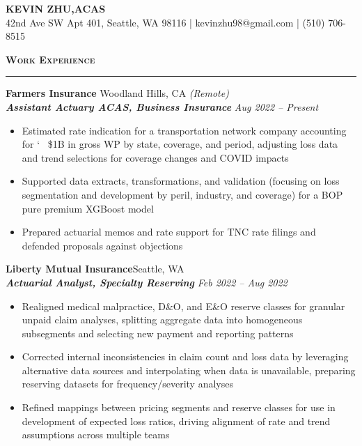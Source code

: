 \documentclass[11pt,letterpaper]{article}
\newcommand{\sectline}{\vspace{5pt}\hrule height 1.5pt\vspace{5pt}}
\newcommand{\sectspace}{\vspace{9pt}}
\newcommand{\smallspace}{\vspace{6pt}}
\newcommand{\heading}[1]{{\fontsize{12pt}{13pt} {\textbf{\textsc{#1}}}}}
\begin{document}
\centering
{\fontsize{13pt}{13pt}\selectfont \textbf{KEVIN ZHU,\hspace{1.7 mm}ACAS}} \vspace{2pt} \\

{\fontsize{11pt}{13pt} 42nd Ave SW Apt 401, Seattle, WA 98116 | kevinzhu98@gmail.com | (510) 706-8515}
\sectspace

\fontsize{11pt}{13.75pt}\selectfont
\raggedright

\heading{Work Experience}\sectline
\textbf{Farmers Insurance} \hfill Woodland Hills, CA \textit{(Remote)}\\
\textbf{\textit{Assistant Actuary ACAS, Business Insurance}} \hfill \textit{Aug 2022 -- Present}
\begin{itemize}
	\item Estimated rate indication for a transportation network company accounting for \char`~ \$1B in gross WP by state, coverage, and period, adjusting loss data and trend selections for coverage changes and COVID impacts
	\item Supported data extracts, transformations, and validation (focusing on loss segmentation and development by peril, industry, and coverage) for a BOP pure premium XGBoost model
	\item Prepared actuarial memos and rate support for TNC rate filings and defended proposals against objections
\end{itemize}
\smallspace
\textbf{Liberty Mutual Insurance}\hfill Seattle, WA \\
\textbf{\textit{Actuarial Analyst, Specialty Reserving}} \hfill \textit{Feb 2022 -- Aug 2022} \\
\begin{itemize}
	\item Realigned medical malpractice, D\&O, and E\&O reserve classes for granular unpaid claim analyses, splitting aggregate data into homogeneous subsegments and selecting new payment and reporting patterns
	\item Corrected internal inconsistencies in claim count and loss data by leveraging alternative data sources and interpolating when data is unavailable, preparing reserving datasets for frequency/severity analyses
	\item Refined mappings between pricing segments and reserve classes for use in development of expected loss ratios, driving alignment of rate and trend assumptions across multiple teams
	
\end{itemize}
\end{document}
